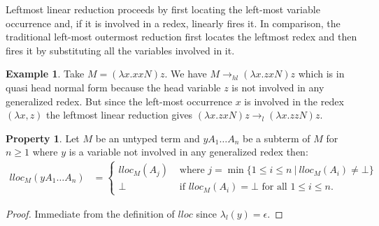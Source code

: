 \documentclass{article}
\theoremstyle{definition}
\newtheorem{property}{Property}[section]
\newtheorem{example}{Example}[section]
\begin{document}
Leftmost linear reduction proceeds by first locating the left-most variable occurrence and, if it is involved in a redex, linearly fires it. In comparison, the traditional left-most outermost reduction first locates the leftmost redex and then fires it by substituting all the variables involved in it.

\begin{example}
Take $M = (\lambda x. x x N) z$. We have $M \rightarrow_{hl} (\lambda x. z x N) z$ which is in quasi head normal form because the head variable $z$ is not involved in any generalized redex.
But since the left-most occurrence $x$ is involved in the redex $(\lambda x, z)$ the leftmost linear reduction gives $(\lambda x. z x N) z \rightarrow_l (\lambda x. z z N) z$.
\end{example}

\begin{property}
\label{prop:qnf_longapply}
    Let $M$ be an untyped term and $y A_1 \ldots A_n$ be a subterm of $M$ for $n\geq1$ where $y$ is a variable not involved in any generalized redex then:
    \begin{align*}
    lloc_M(y A_1 \ldots A_n) &=
        \begin{cases}
         lloc_M (A_j) &\mbox{ where } j = \min \{ 1\leq i\leq n \ | \ lloc_M (A_i) \neq \bot\} \\
         \bot &\mbox{ if } lloc_M(A_i) = \bot \mbox{ for all } 1\leq i\leq n.
        \end{cases}
    \end{align*}
    \end{property}
    \begin{proof}
    Immediate from the definition of $lloc$ since $\lambda_l(y) = \epsilon$.
    \end{proof}
\end{document}

